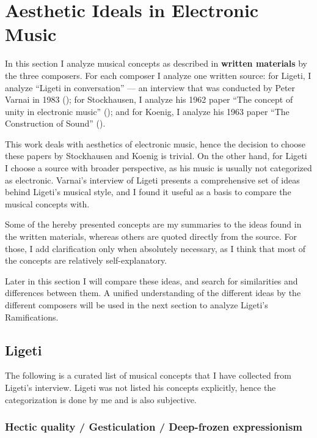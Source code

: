 \documentclass[a4paper,11pt]{article}
\begin{document}
\section{Aesthetic Ideals in Electronic Music}
\label{sec:aesthetic_ideals_in_electronic_music}

In this section I analyze musical concepts as described in \textbf{written materials} by the three composers.
For each composer I analyze one written source:
for Ligeti, I analyze ``Ligeti in conversation'' --- an interview that was conducted by Peter Varnai in 1983 (\citeauthor{varnai});
for Stockhausen, I analyze his 1962 paper ``The concept of unity in electronic music'' (\citeauthor{stockhausen});
and for Koenig, I analyze his 1963 paper ``The Construction of Sound'' (\citeauthor{koenig}).

This work deals with aesthetics of electronic music, hence the decision to choose these papers by Stockhausen and Koenig is trivial.
On the other hand, for Ligeti I choose a source with broader perspective, as his music is usually not categorized as electronic.
Varnai's interview of Ligeti presents a comprehensive set of ideas behind Ligeti's musical style, and I found it useful as a basis to compare the musical concepts with.

Some of the hereby presented concepts are my summaries to the ideas found in the written materials, whereas others are quoted directly from the source.
For those, I add clarification only when absolutely necessary, as I think that most of the concepts are relatively self-explanatory.

Later in this section I will compare these ideas, and search for similarities and differences between them.
A unified understanding of the different ideas by the different composers will be used in the next section to analyze  Ligeti's Ramifications.

\subsection{Ligeti}
\label{sub:eshtetic_ligeti}

The following is a curated list of musical concepts that I have collected from Ligeti's interview.
Ligeti was not listed his concepts explicitly, hence the categorization is done by me and is also subjective.

\subsubsection{Hectic quality / Gesticulation / Deep-frozen expressionism}
\label{subs:ligeti:hectic}
\end{document}
